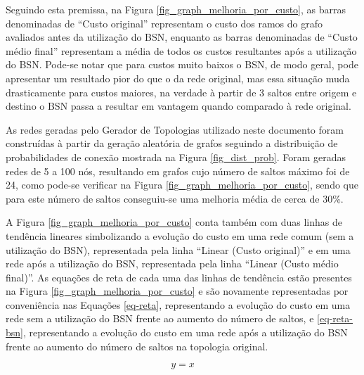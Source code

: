 
Seguindo esta premissa, na Figura \ref{fig_graph_melhoria_por_custo}, as barras denominadas de ``Custo original'' representam o custo dos ramos do grafo avaliados antes da utilização do BSN, enquanto as barras denominadas de ``Custo médio final'' representam a média de todos os custos resultantes após a utilização do BSN. Pode-se notar que para custos muito baixos o BSN, de modo geral, pode apresentar um resultado pior do que o da rede original, mas essa situação muda drasticamente para custos maiores, na verdade à partir de 3 saltos entre origem e destino o BSN passa a resultar em vantagem quando comparado à rede original.

As redes geradas pelo Gerador de Topologias utilizado neste documento foram construídas à partir da geração aleatória de grafos seguindo a distribuição de probabilidades de conexão mostrada na Figura \ref{fig_dist_prob}. Foram geradas redes de 5 a 100 nós, resultando em grafos cujo número de saltos máximo foi de 24, como pode-se verificar na Figura \ref{fig_graph_melhoria_por_custo}, sendo que para este número de saltos conseguiu-se uma melhoria média de cerca de 30\%.

A Figura \ref{fig_graph_melhoria_por_custo} conta também com duas linhas de tendência lineares simbolizando a evolução do custo em uma rede comum (sem a utilização do BSN), representada pela linha ``Linear (Custo original)'' e em uma rede após a utilização do BSN, representada pela linha ``Linear (Custo médio final)''. As equações de reta de cada uma das linhas de tendência estão presentes na Figura \ref{fig_graph_melhoria_por_custo} e são novamente representadas por conveniência nas Equações \ref{eq-reta}, representando a evolução do custo em uma rede sem a utilização do BSN frente ao aumento do número de saltos, e \ref{eq-reta-bsn}, representando a evolução do custo em uma rede após a utilização do BSN frente ao aumento do número de saltos na topologia original.

\begin{equation}
y = x
\label{eq-reta}
\end{equation}

